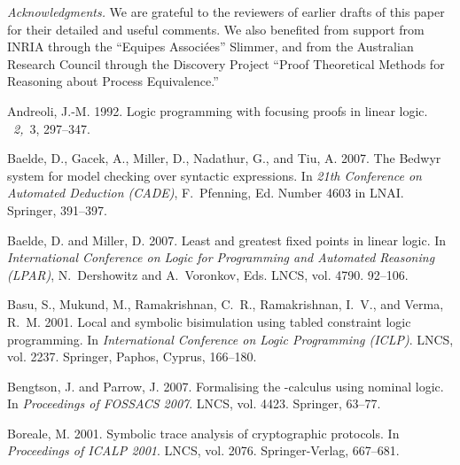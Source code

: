 \documentclass{acmtrans2m}
\begin{document}
\smallskip
\noindent
{\em Acknowledgments.}  We are grateful to the reviewers of earlier
drafts of this paper for their detailed and useful comments.  We also
benefited from support from INRIA through the ``Equipes
Associ{\'e}es'' Slimmer, and from the Australian Research Council
through the Discovery Project ``Proof Theoretical Methods for 
Reasoning about Process Equivalence.''
\par 

\begin{thebibliography}{}

{\sc Andreoli, J.-M.} 1992.
\newblock Logic programming with focusing proofs in linear logic.
~{\em 2,\/}~3, 297--347.

{\sc Baelde, D.}, {\sc Gacek, A.}, {\sc Miller, D.}, {\sc Nadathur, G.}, {\sc
  and} {\sc Tiu, A.} 2007.
\newblock The {Bedwyr} system for model checking over syntactic expressions.
\newblock In {\em 21th Conference on Automated Deduction (CADE)},
  {F.~Pfenning}, Ed. Number 4603 in LNAI. Springer, 391--397.

{\sc Baelde, D.} {\sc and} {\sc Miller, D.} 2007.
\newblock Least and greatest fixed points in linear logic.
\newblock In {\em International Conference on Logic for Programming and
  Automated Reasoning (LPAR)}, {N.~Dershowitz} {and} {A.~Voronkov}, Eds. LNCS,
  vol. 4790. 92--106.

{\sc Basu, S.}, {\sc Mukund, M.}, {\sc Ramakrishnan, C.~R.}, {\sc Ramakrishnan,
  I.~V.}, {\sc and} {\sc Verma, R.~M.} 2001.
\newblock Local and symbolic bisimulation using tabled constraint logic
  programming.
\newblock In {\em International Conference on Logic Programming ({ICLP})}.
  LNCS, vol. 2237. Springer, Paphos, Cyprus, 166--180.

{\sc Bengtson, J.} {\sc and} {\sc Parrow, J.} 2007.
\newblock Formalising the -calculus using nominal logic.
\newblock In {\em Proceedings of FOSSACS 2007}. LNCS, vol. 4423. Springer,
  63--77.

{\sc Boreale, M.} 2001.
\newblock Symbolic trace analysis of cryptographic protocols.
\newblock In {\em Proceedings of ICALP 2001}. LNCS, vol. 2076. Springer-Verlag,
  667--681.


\end{thebibliography}
\end{document}
